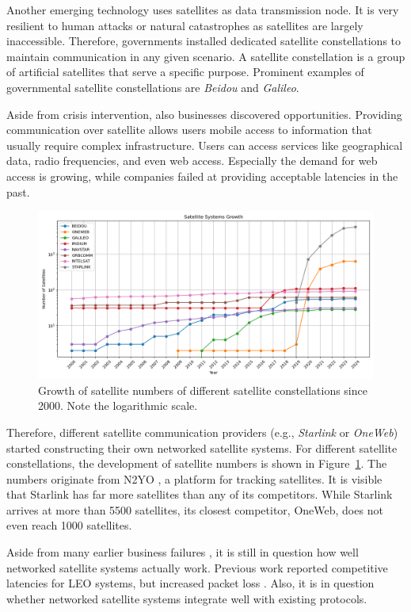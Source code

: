 Another emerging technology uses satellites as data transmission node. It is very resilient to human attacks or natural catastrophes as satellites are largely inaccessible. Therefore, governments installed dedicated satellite constellations to maintain communication in any given scenario. A satellite constellation is a group of artificial satellites that serve a specific purpose. Prominent examples of governmental satellite constellations are \textit{Beidou} and \textit{Galileo}.

Aside from crisis intervention, also businesses discovered opportunities. Providing communication over satellite allows users mobile access to information that usually require complex infrastructure. Users can access services like geographical data, radio frequencies, and even web access. Especially the demand for web access is growing, while companies failed at providing acceptable latencies in the past.

\begin{figure}
	\label{fig:satellitegrowth}
	\centering
	\includegraphics[width=\textwidth]{./chapters/img/satellite-growth.png}
	\caption{Growth of satellite numbers of different satellite constellations since 2000. Note the logarithmic scale.}
\end{figure}

Therefore, different satellite communication providers (e.g., \textit{Starlink} or \textit{OneWeb}) started constructing their own networked satellite systems.
For different satellite constellations, the development of satellite numbers is shown in Figure~\ref{fig:satellitegrowth}. The numbers originate from N2YO \cite{N2YO2024}, a platform for tracking satellites.
It is visible that Starlink has far more satellites than any of its competitors. While Starlink arrives at more than 5500 satellites, its closest competitor, OneWeb, does not even reach 1000 satellites.

Aside from many earlier business failures \cite{Chan2002, Barboza2000}, it is still in question how well networked satellite systems actually work. Previous work reported competitive latencies for \ac{LEO} systems, but increased packet loss \cite{DBLP:conf/imc/MichelTGB22}.
Also, it is in question whether networked satellite systems integrate well with existing protocols.


